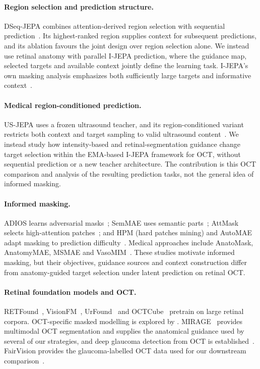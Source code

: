 \documentclass{article}
\begin{document}
\paragraph{Region selection and prediction structure.}
DSeq-JEPA combines attention-derived region selection with sequential
prediction~\citep{he2025dseqjepa}. Its highest-ranked region supplies
context for subsequent predictions, and its ablation favours the joint design
over region selection alone. We instead use retinal anatomy with parallel
I-JEPA prediction, where the guidance map, selected targets and available
context jointly define the learning task. I-JEPA's own masking analysis emphasizes both
sufficiently large targets and informative context~\citep{assran2023ijepa}.

\paragraph{Medical region-conditioned prediction.}
US-JEPA uses a frozen ultrasound teacher, and its region-conditioned variant
restricts both context and target sampling to valid ultrasound
content~\citep{radhachandran2026usjepa}. We instead study how intensity-based
and retinal-segmentation guidance change target selection within the
EMA-based I-JEPA framework for OCT, without sequential prediction or a new
teacher architecture. The contribution is this OCT comparison and analysis of
the resulting prediction tasks, not the general idea of informed masking.

\paragraph{Informed masking.}
ADIOS learns adversarial masks~\citep{shi2022adios}; SemMAE uses semantic
parts~\citep{li2022semmae}; AttMask selects high-attention
patches~\citep{kakogeorgiou2022attmask}; and HPM (hard patches mining) and AutoMAE adapt
masking to prediction difficulty~\citep{wang2023hpm,chen2023automae}.
Medical approaches include AnatoMask, AnatomyMAE, MSMAE and
VasoMIM~\citep{li2024anatomask,ceballosarroyo2026anatomymae,mao2023msmae,huang2026vasomim}.
These studies motivate informed masking, but their objectives, guidance
sources and context construction differ from anatomy-guided target selection
under latent prediction on retinal OCT.

\paragraph{Retinal foundation models and OCT.}
RETFound~\citep{zhou2023retfound}, VisionFM~\citep{qiu2024visionfm},
UrFound~\citep{yu2024urfound} and OCTCube~\citep{liu2026octcube} pretrain on
large retinal corpora. OCT-specific masked modelling is explored by
\citet{pissas2024octmim}. MIRAGE~\citep{morano2025mirage} provides multimodal
OCT segmentation and supplies the anatomical guidance used by several of our
strategies, and deep glaucoma detection from OCT is
established~\citep{maetschke2019glaucoma,ran2019glaucoma,noury2022glaucoma}.
FairVision provides the glaucoma-labelled OCT data used for our
downstream comparison~\citep{luo2024fairvision}.
\end{document}
